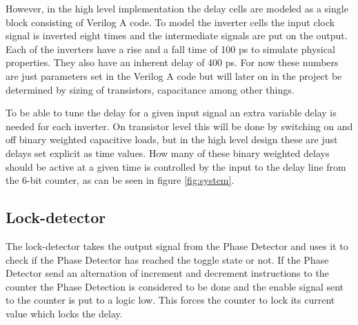 \documentclass[a4paper,12pt]{article} \usepackage{graphicx}
\begin{document}
However, in the high level implementation the delay cells are modeled
as a single block consisting of Verilog A code. To model the inverter
cells the input clock signal is inverted eight times and the intermediate
signals are put on the output. Each of the inverters have a rise and a
fall time of 100 ps to simulate physical properties. They also have an
inherent delay of 400 ps. For now these numbers are just parameters set
in the Verilog A code but will later on in the project be determined
by sizing of transistors, capacitance among other things.

To be able to tune the delay for a given input signal an extra
variable delay is needed for each inverter. On transistor level this
will be done by switching on and off binary weighted capacitive loads,
but in the high level design these are just delays set explicit as time
values. How many of these binary weighted delays should be active at a
given time is controlled by the input to the delay line from the 6-bit
counter, as can be seen in figure \ref{fig:system}. 


\subsection{Lock-detector}
The lock-detector takes the output signal from the Phase Detector and uses
it to check if the Phase Detector has reached the toggle state or not. If the Phase
Detector send an alternation of increment and decrement instructions to the counter
the Phase Detection is considered to be done and the enable signal sent to the 
counter is put to a logic low. This forces the counter to lock its current value 
which locks the delay.
\end{document}
